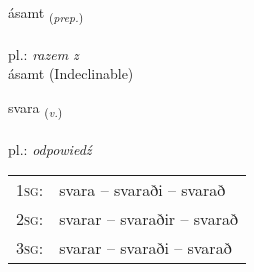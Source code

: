 \documentclass[frontgrid, backgrid]{flacards}\usepackage[]{graphicx}\usepackage[]{xcolor}
\begin{document}

\renewcommand{\flhead}{\vskip5pt \fboxsep=0pt {\small\bfseries\footnotesize Forsetning | Preposition}}
\renewcommand{\fcfoot}{\vskip5pt \fboxsep=0pt \hspace{2pt}{\small\bfseries\footnotesize 1K}}

\renewcommand{\blhead}{\vskip5pt {\small\bfseries\footnotesize Forsetning | Preposition }}
\renewcommand{\bcfoot}{\vskip5pt \hspace{2pt}{\small\bfseries\footnotesize 1K}}


{ásamt \small{\textsubscript{(\textit{prep.})}} \\[1ex]
\textphonetic{[auːsam̥t]} \\
pl.: \emph{razem z} \\  [2ex]
ásamt (Indeclinable)}

\renewcommand{\flhead}{\vskip5pt \fboxsep=0pt {\small\bfseries\footnotesize Sagnorð | Verb}}
\renewcommand{\fcfoot}{\vskip5pt \fboxsep=0pt \hspace{2pt}{\small\bfseries\footnotesize 1K}}

\renewcommand{\blhead}{\vskip5pt {\small\bfseries\footnotesize Sagnorð | Verb }}
\renewcommand{\bcfoot}{\vskip5pt \hspace{2pt}{\small\bfseries\footnotesize 1K}}


{svara \small{\textsubscript{(\textit{v.})}} \\[1ex] %
\textphonetic{[svaːra]} \\
pl.: \emph{odpowiedź} \\  [2ex]
\renewcommand*{\arraystretch}{0.8}
\begin{tabular}{p{1cm}l}
\textsc{1sg}: & svara -- svaraði -- svarað \\ 
\textsc{2sg}: & svarar -- svaraðir -- svarað \\ 
\textsc{3sg}: & svarar -- svaraði -- svarað \\ 
\end{tabular}
}
\end{document}
